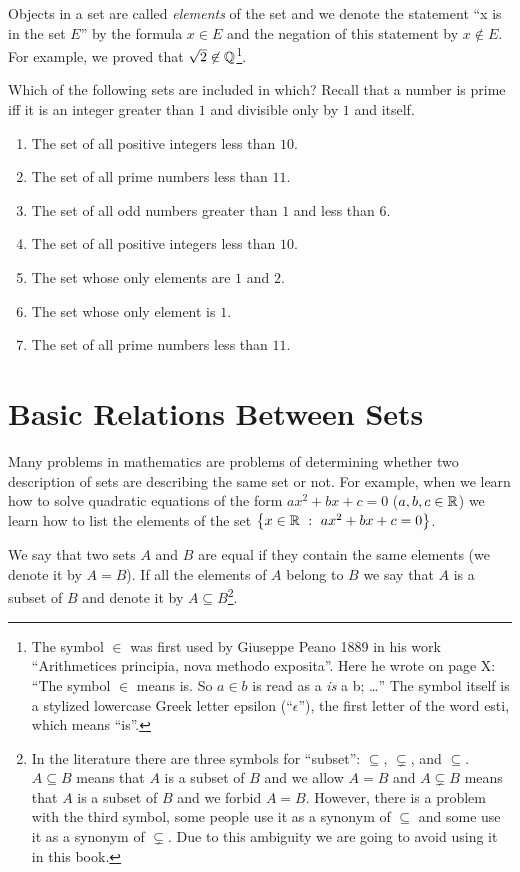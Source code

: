 Objects in a set are called \textit{elements} of the set and we denote the
statement ``x is in the set $E$'' by the formula $x \in E$ and the negation of
this statement by $x \not\in E$. For example, we proved that
$\sqrt{2} \not\in \mathbb{Q}$\footnote{%
  The symbol $\in$ was first used by Giuseppe Peano 1889 in his work
  ``Arithmetices principia, nova methodo exposita''. Here he wrote on page X:
  ``The symbol $\in$ means is. So $a \in b$ is read as a \textit{is} a b;
  \dots''
  The symbol itself is a stylized lowercase Greek letter epsilon
  (``$\epsilon$''), the first letter of the word  \textgreek{esti}, which means
  ``is''.
}.

\begin{exercise}
  \label{exercise:inclusion}

  Which of the following sets are included in which? Recall that a number is
  prime iff it is an integer greater than $1$ and divisible only by $1$ and
  itself.
  \begin{enumerate}
    \item The set of all positive integers less than $10$.
    \item The set of all prime numbers less than $11$.
    \item The set of all odd numbers greater than $1$ and less than $6$.
    \item The set of all positive integers less than $10$.
    \item The set whose only elements are $1$ and $2$.
    \item The set whose only element is $1$.
    \item The set of all prime numbers less than $11$.
  \end{enumerate}
\end{exercise}

\section{Basic Relations Between Sets}
Many problems in mathematics are problems of determining whether two description
of sets are describing the same set or not. For example, when we learn how to
solve quadratic equations of the form $ax^2 + bx + c = 0$ ($a, b, c \in \mathbb{R}$) we
learn how to list the elements of the set $\set[ax^2 + bx + c = 0]{x \in \R}$.

We say that two sets $A$ and $B$ are equal if they contain the
same elements (we denote it by $A = B$). If all the elements of $A$ belong to
$B$ we say that $A$ is a subset of $B$ and denote it by
$A \subseteq B$\footnote{%
  In the literature there are three symbols for ``subset'': $\subseteq$,
  $\subsetneq$, and $\subseteq$. $A \subseteq B$ means that $A$ is a subset of
  $B$ and we allow $A = B$ and $A \subsetneq B$ means that $A$ is a subset of
  $B$ and we forbid $A = B$. However, there is a problem with the third symbol,
  some people use it as a synonym of $\subseteq$ and some use it as a synonym of
  $\subsetneq$. Due to this ambiguity we are going to avoid using it in this
  book.
}.

